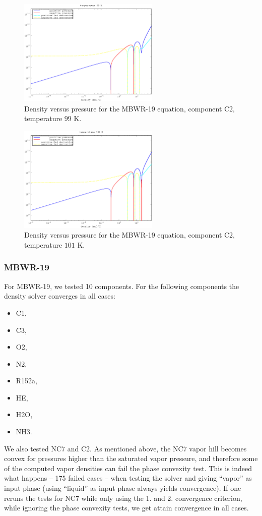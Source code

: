 \documentclass[internal,english]{sintefmemo2012}
\numberwithin{equation}{section}
\begin{document}
\begin{figure}[h]
  \centering
  \includegraphics[width=0.6\textwidth]{figures/C2.eps}
  \caption{Density versus pressure for the MBWR-19 equation, component
    C2, temperature $99$ K.}
  \label{C2}
\end{figure}
\begin{figure}[h]
  \centering
  \includegraphics[width=0.6\textwidth]{figures/C2_101.eps}
  \caption{Density versus pressure for the MBWR-19 equation, component
    C2, temperature $101$ K.}
  \label{C2_101}
\end{figure}

\subsubsection*{MBWR-19}
For MBWR-19, we tested 10 components. For the following components the
density solver converges in all cases:
\begin{itemize}
\item C1,
\item C3,
\item O2,
\item N2,
\item R152a,
\item HE,
\item H2O,
\item NH3.
\end{itemize}
We also tested NC7 and C2. As mentioned above, the NC7 vapor hill becomes convex for
pressures higher than the saturated vapor pressure, and therefore some of the
computed vapor densities can fail the phase convexity test. This is
indeed what happens -- 175 failed cases -- when testing the solver and giving
``vapor'' as input phase (using ``liquid'' as input phase always
yields convergence). If one reruns the tests for NC7 while only using
the 1. and 2. convergence criterion, while ignoring the phase
convexity tests, we get attain convergence in all cases.
\end{document}
